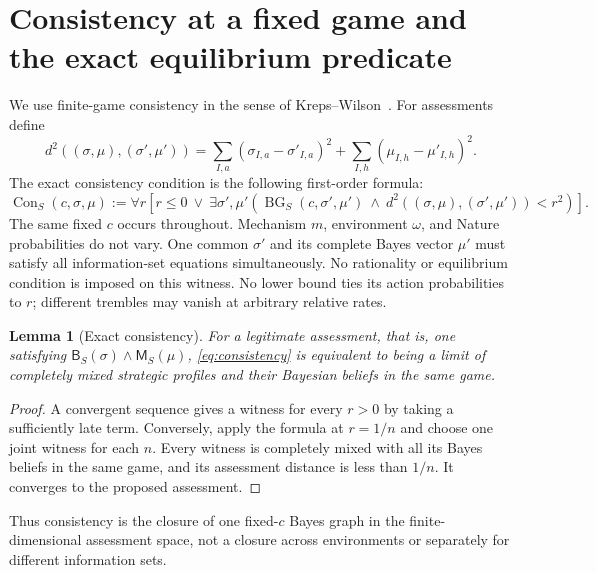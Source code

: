 \documentclass[11pt,a4paper]{article}
\numberwithin{equation}{section}
\newtheorem{lemma}[theorem]{Lemma}
\theoremstyle{definition}
\DeclareMathOperator{\BG}{BG}
\DeclareMathOperator{\Con}{Con}
\begin{document}
\section{Consistency at a fixed game and the exact equilibrium predicate}
\label{sec:consistency}
We use finite-game consistency in the sense of
Kreps--Wilson~\cite{KW1982}.
For assessments define
\[
 d^2((\sigma,\mu),(\sigma',\mu'))
 =\sum_{I,a}(\sigma_{I,a}-\sigma'_{I,a})^2
       +\sum_{I,h}(\mu_{I,h}-\mu'_{I,h})^2.
\]
The exact consistency condition is the following first-order formula:
\begin{equation}\label{eq:consistency}
 \Con_S(c,\sigma,\mu):=
 \forall r\left[
 r\le0\ \vee\
 \exists\sigma',\mu'\left(
 \BG_S(c,\sigma',\mu')\ \wedge\
 d^2((\sigma,\mu),(\sigma',\mu'))<r^2\right)\right].
\end{equation}
The same fixed \(c\) occurs throughout. Mechanism \(m\), environment
\(\omega\), and Nature probabilities do not vary.
One common \(\sigma'\) and its complete Bayes vector \(\mu'\) must
satisfy all information-set equations simultaneously.
No rationality or equilibrium condition is imposed on this witness.
No lower bound ties its action probabilities to \(r\); different
trembles may vanish at arbitrary relative rates.

\begin{lemma}[Exact consistency]\label{lem:consistency}
For a legitimate assessment, that is, one satisfying
\(\mathsf B_S(\sigma)\wedge\mathsf M_S(\mu)\), \eqref{eq:consistency} is equivalent to
being a limit of completely mixed strategic profiles and their
Bayesian beliefs in the same game.
\end{lemma}
\begin{proof}
A convergent sequence gives a witness for every \(r>0\) by taking a
sufficiently late term. Conversely, apply the formula at \(r=1/n\)
and choose one joint witness for each \(n\).
Every witness is completely mixed with all its Bayes beliefs in the
same game, and its assessment distance is less than \(1/n\).
It converges to the proposed assessment.
\end{proof}
Thus consistency is the closure of one fixed-\(c\) Bayes graph in
the finite-dimensional assessment space, not a closure across
environments or separately for different information sets.
\end{document}
